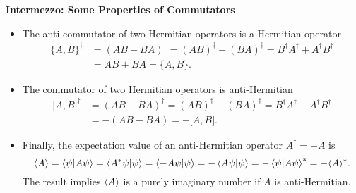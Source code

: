 \documentclass[11pt, a4paper]{article}
\begin{document}
\textbf{Intermezzo: Some Properties of Commutators}
\begin{itemize}
	\item The anti-commutator of two Hermitian operators is a Hermitian operator
	\begin{align*}
		\big\{A, B\big\}^{\dagger} &= (AB + BA)^{\dagger} = (AB)^{\dagger} + (BA)^{\dagger} = B^{\dagger}A^{\dagger} + A^{\dagger}B^{\dagger}\\
		&=AB + BA = \big\{A, B\big\}.
	\end{align*}
	
	\item The commutator of two Hermitian operators is anti-Hermitian
	\begin{align*}
		\big[A, B\big]^{\dagger} &= (AB - BA)^{\dagger} = (AB)^{\dagger} - (BA)^{\dagger} = B^{\dagger}A^{\dagger} - A^{\dagger}B^{\dagger}\\
		&= - (AB - BA) = - \big[A, B\big].
	\end{align*}
	
	\item Finally, the expectation value of an anti-Hermitian operator $ A^{\dagger} = - A $ is
	\begin{equation*}
		\langle A \rangle = \braket{\psi}{A\psi} = \braket{A^{*}\psi}{\psi} = \braket{-A\psi}{\psi} = - \braket{A\psi}{\psi} = - \braket{\psi}{A\psi}^{*} = - \langle A \rangle^{*}.
	\end{equation*}
	The result implies $ \expval{A} $ is a purely imaginary number if $ A $ is anti-Hermitian.
\end{itemize}
\end{document}
